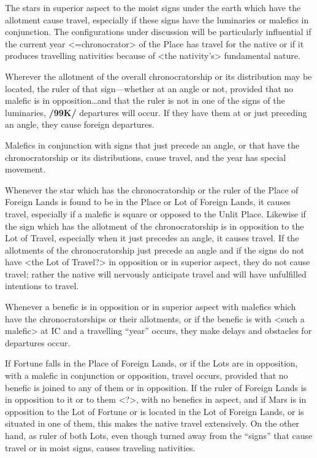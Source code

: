 The stars in superior aspect to the moist signs under the earth which have the allotment cause travel, especially if these signs have the luminaries or malefics in conjunction. The configurations under discussion will be particularly influential if the current year <=chronocrator> of the Place has travel for the native or if it produces travelling nativities because of <the nativity’s> fundamental nature. 

Wherever the allotment of the overall chronocratorship or its distribution may be located, the ruler of that sign—whether at an angle or not, provided that no malefic is in opposition\ldots and that the ruler is not in one of the signs of the luminaries, \textbf{/99K/} departures will occur. If they have them at or just preceding an angle, they cause foreign departures.

Malefics in conjunction with signs that just precede an angle, or that have the chronocratorship or its distributions, cause travel, and the year has special movement. 

Whenever the star which has the chronocratorship or the ruler of the Place of Foreign Lands is found to be in the Place or Lot of Foreign Lands, it causes travel, especially if a malefic is square or opposed to the Unlit Place. Likewise if the sign which has the allotment of the chronocratorship is in opposition to the Lot of Travel, especially when it just precedes an angle, it causes travel. If the allotments of the chronocratorship just precede an angle and if the signs do not have <the Lot of Travel?> in opposition or in superior aspect, they do not cause travel; rather the native will nervously anticipate travel and will have unfulfilled intentions to travel. 

Whenever a benefic is in opposition or in superior aspect with malefics which have the chronocratorships or their allotments, or if the benefic is with <such a malefic> at IC and a travelling “year” occurs, they make delays and obstacles for departures occur.

If Fortune falls in the Place of Foreign Lands, or if the Lots are in opposition, with a malefic in conjunction or opposition, travel occurs, provided that no benefic is joined to any of them or in opposition. If the ruler of Foreign Lands is in opposition to it or to them <?>, with no benefics in aspect, and if Mars is in opposition to the Lot of Fortune or is located in the Lot of Foreign Lands, or is situated in one of them, this makes the native travel extensively. On the other hand, \Mars\xspace as ruler of both Lots, even though turned away from the “signs” that cause travel or in moist signs, causes traveling nativities. 

